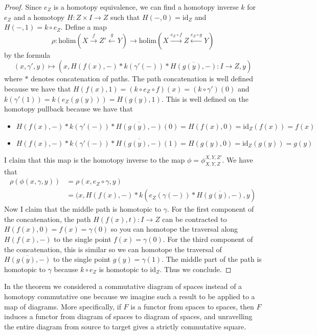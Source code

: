 \documentclass[a4paper]{article}
\begin{document}
\begin{thm}{}{}
\begin{proof}
Since $e_Z$ is a homotopy equivalence, we can find a homotopy inverse $k$ for $e_Z$ and a homotopy $H:Z\times I\to Z$ such that $H(-,0)=\text{id}_Z$ and $H(-,1)=k\circ e_Z$. Define a map $$\rho:\text{holim}(X\overset{f}{\rightarrow}Z'\overset{g}{\leftarrow}Y)\to\text{holim}(X\overset{e_Z\circ f}{\rightarrow}Z\overset{e_Z\circ g}{\leftarrow}Y)$$ by the formula $$(x,\gamma',y)\mapsto(x,H(f(x),-)\ast k(\gamma'(-))\ast\overline{H(g(y),-)}:I\to Z,y)$$ where $\ast$ denotes concatenation of paths. The path concatenation is well defined because we have that $H(f(x),1)=(k\circ e_Z\circ f)(x)=(k\circ\gamma')(0)$ and $k(\gamma'(1))=k(e_Z(g(y)))=H(g(y),1)$. This is well defined on the homotopy pullback because we have that 
\begin{itemize}
\item $H(f(x),-)\ast k(\gamma'(-))\ast\overline{H(g(y),-)}(0)=H(f(x),0)=\text{id}_Z(f(x))=f(x)$
\item $H(f(x),-)\ast k(\gamma'(-))\ast\overline{H(g(y),-)}(1)=H(g(y),0)=\text{id}_Z(g(y))=g(y)$
\end{itemize}
I claim that this map is the homotopy inverse to the map $\phi=\phi_{X,Y,Z}^{X,Y,Z'}$. We have that 
\begin{align*}
\rho(\phi(x,\gamma,y))&=\rho(x,e_Z\circ\gamma,y)\\
&=(x,H(f(x),-)\ast k(e_Z(\gamma(-))\ast\overline{H(g(y),-)},y)
\end{align*}
Now I claim that the middle path is homotopic to $\gamma$. For the first component of the concatenation, the path $H(f(x),t):I\to Z$ can be contracted to $H(f(x),0)=f(x)=\gamma(0)$ so you can homotope the traversal along $H(f(x),-)$ to the single point $f(x)=\gamma(0)$. For the third component of the concatenation, this is similar so we can homotope the traversal of $\overline{H(g(y),-)}$ to the single point $g(y)=\gamma(1)$. The middle part of the path is homotopic to $\gamma$ because $k\circ e_Z$ is homotopic to $\text{id}_Z$. Thus we conclude. 
\end{proof}
\end{thm}

In the theorem we considered a commutative diagram of spaces instead of a homotopy commutative one because we imagine such a result to be applied to a map of diagrams. More specifically, if $F$ is a functor from spaces to spaces, then $F$ induces a functor from diagram of spaces to diagram of spaces, and unravelling the entire diagram from source to target gives a strictly commutative square. 
\end{document}

